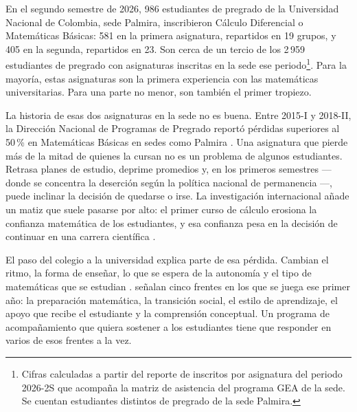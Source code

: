 
En el segundo semestre de 2026, 986 estudiantes de pregrado de la Universidad Nacional de Colombia, sede Palmira, inscribieron Cálculo Diferencial o Matemáticas Básicas: 581 en la primera asignatura, repartidos en 19 grupos, y 405 en la segunda, repartidos en 23. Son cerca de un tercio de los 2\,959 estudiantes de pregrado con asignaturas inscritas en la sede ese periodo\footnote{Cifras calculadas a partir del reporte de inscritos por asignatura del periodo 2026-2S que acompaña la matriz de asistencia del programa GEA de la sede. Se cuentan estudiantes distintos de pregrado de la sede Palmira.}. Para la mayoría, estas asignaturas son la primera experiencia con las matemáticas universitarias. Para una parte no menor, son también el primer tropiezo.

La historia de esas dos asignaturas en la sede no es buena. Entre 2015-I y 2018-II, la Dirección Nacional de Programas de Pregrado reportó pérdidas superiores al 50\,\% en Matemáticas Básicas en sedes como Palmira \parencite{unal2021gea}. Una asignatura que pierde más de la mitad de quienes la cursan no es un problema de algunos estudiantes. Retrasa planes de estudio, deprime promedios y, en los primeros semestres ---donde se concentra la deserción según la política nacional de permanencia \parencite{men2015permanencia}---, puede inclinar la decisión de quedarse o irse. La investigación internacional añade un matiz que suele pasarse por alto: el primer curso de cálculo erosiona la confianza matemática de los estudiantes, y esa confianza pesa en la decisión de continuar en una carrera científica \parencite{ellis2016calculus}.

El paso del colegio a la universidad explica parte de esa pérdida. Cambian el ritmo, la forma de enseñar, lo que se espera de la autonomía y el tipo de matemáticas que se estudian \parencite{gueudet2008transition,biza2016tertiary}. \textcite{engelbrecht2015interventions} señalan cinco frentes en los que se juega ese primer año: la preparación matemática, la transición social, el estilo de aprendizaje, el apoyo que recibe el estudiante y la comprensión conceptual. Un programa de acompañamiento que quiera sostener a los estudiantes tiene que responder en varios de esos frentes a la vez.

